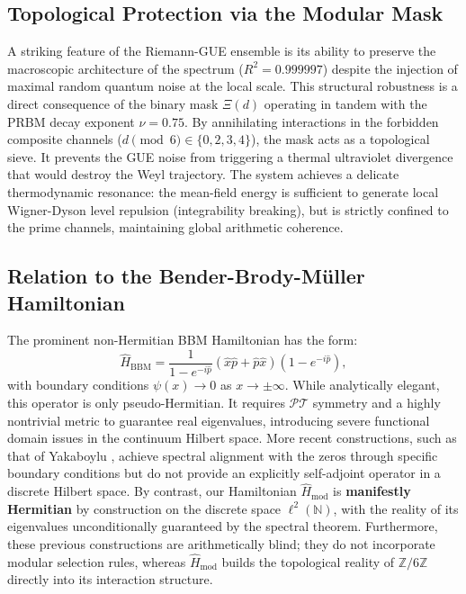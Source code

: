 \documentclass[aps,prl,preprint,superscriptaddress,floatfix]{revtex4-2}
\newcommand{\Zmod}{\mathbb{Z}/6\mathbb{Z}}
\begin{document}
\subsection{Topological Protection via the Modular Mask}

A striking feature of the Riemann-GUE ensemble is its ability to preserve the macroscopic architecture of the spectrum ($R^2 = 0.999997$) despite the injection of maximal random quantum noise at the local scale. This structural robustness is a direct consequence of the binary mask $\Xi(d)$ operating in tandem with the PRBM decay exponent $\nu = 0.75$. By annihilating interactions in the forbidden composite channels ($d \pmod 6 \in \{0, 2, 3, 4\}$), the mask acts as a topological sieve. It prevents the GUE noise from triggering a thermal ultraviolet divergence that would destroy the Weyl trajectory. The system achieves a delicate thermodynamic resonance: the mean-field energy is sufficient to generate local Wigner-Dyson level repulsion (integrability breaking), but is strictly confined to the prime channels, maintaining global arithmetic coherence.

\subsection{Relation to the Bender-Brody-M\"uller Hamiltonian}

The prominent non-Hermitian BBM Hamiltonian \cite{Bender2017} has the form:
\begin{equation}
\hat{H}_{\text{BBM}} = \frac{1}{1 - e^{-i\hat{p}}} (\hat{x}\hat{p} + \hat{p}\hat{x}) (1 - e^{-i\hat{p}}),
\end{equation}
with boundary conditions $\psi(x) \to 0$ as $x \to \pm\infty$. While analytically elegant, this operator is only pseudo-Hermitian. It requires $\mathcal{PT}$ symmetry and a highly nontrivial metric to guarantee real eigenvalues, introducing severe functional domain issues in the continuum Hilbert space. More recent constructions, such as that of Yakaboylu \cite{Yakaboylu2024}, achieve spectral alignment with the zeros through specific boundary conditions but do not provide an explicitly self-adjoint operator in a discrete Hilbert space. By contrast, our Hamiltonian $\hat{H}_{\text{mod}}$ is \textbf{manifestly Hermitian} by construction on the discrete space $\ell^2(\mathbb{N})$, with the reality of its eigenvalues unconditionally guaranteed by the spectral theorem. Furthermore, these previous constructions are arithmetically blind; they do not incorporate modular selection rules, whereas $\hat{H}_{\text{mod}}$ builds the topological reality of $\Zmod$ directly into its interaction structure.
\end{document}
